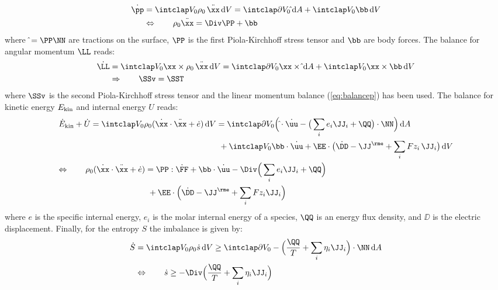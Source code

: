 \begin{align}
  \begin{aligned}
    \dot \pp  & = \intVO \rho_0 \,\ddot\xx \dV = \intdVO \hat\tt \dA + \intVO \bb \dV \\
              & \Leftrightarrow  \qquad \rho_0 \ddot\xx = \Div\PP + \bb
    \label{eq:balancep}
  \end{aligned}
\end{align}
where $\hat\tt=\PP\NN$ are tractions on the surface, $\PP$ is the first Piola-Kirchhoff stress tensor and $\bb$ are body forces. The balance for angular momentum $\LL$ reads:
\begin{align}
  \begin{aligned}
    \dot \LL  &= \intVO \xx \times \rho_0 \,\ddot\xx \dV  = \intdVO \xx \times \hat\tt \dA + \intVO \xx \times \bb \dV\\
              &\Rightarrow \qquad \SSv = \SST
  \end{aligned}
\end{align}
where $\SSv$ is the second Piola-Kirchhoff stress tensor and the linear momentum balance (\cref{eq:balancep}) has been used. The balance for  kinetic energy $E_{\rm kin}$ and internal energy $U$ reads: 
\begin{align}
  \begin{aligned}
  &\begin{aligned}
  \dot E_{\rm kin} + \dot U = \intVO \rho_0(\dot\xx\cdot\ddot\xx + \dot e) \dV &= \intdVO \Big(\hat\tt\cdot\dot\uu -\big(\sum_i e_i \JJ_i+\QQ\big) \cdot \NN \Big) \dA \\
          & \ + \intVO \bb\cdot \dot\uu + \EE\cdot\big(\dot\DD-\JJ^\rme+\sum_i Fz_i\,\JJ_i\big) \dV \\
  \end{aligned} \\
  &\begin{aligned}
    \Leftrightarrow \qquad \rho_0(\dot\xx\cdot\ddot\xx+\dot e) &= \PP:\dot\FF + \bb \cdot \dot\uu - \Div\Big(\sum_i e_i \JJ_i+ \QQ \Big) \\
    & \ + \EE\cdot\Big(\dot \DD-\JJ^\rme+\sum_i Fz_i\JJ_i\Big) 
  \end{aligned}
  \end{aligned}
\end{align}
where $e$ is the specific internal energy, $e_i$ is the molar internal energy of a species, $\QQ$ is an energy flux density, and $\DD$ is the electric displacement. Finally, for the entropy $S$ the imbalance is given by: 
\begin{align}
  \begin{aligned}
    \dot S & = \intVO \rho_0 \dot s \dV \geq \intdVO -\Big(\frac{\QQ}{T} + \sum_i \eta_i\JJ_i\Big) \cdot \NN \dA \\
           & \Leftrightarrow \qquad \dot s \geq -\Div\Big(\frac{\QQ}{T}+\sum_i \eta_i \JJ_i \Big)
  \end{aligned}
\end{align}
